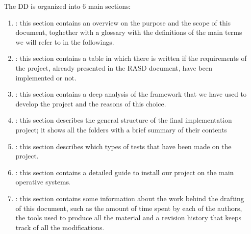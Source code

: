 The DD is organized into 6 main sections:

\begin{enumerate}
\item {\textbf{}}: this section contains an overview on the purpose and the scope of this document, toghether with a glossary with the definitions of the main terms we will refer to in the followings.
\item {\textbf{}}: this section contains a table in which there is written if the requirements of the project, already presented in the RASD document, have been implemented or not.
\item {\textbf{}}: this section contains a deep analysis of the framework that we have used to develop the project and the reasons of this choice.
\item {\textbf{}}: this section describes the general structure of the final implementation project; it shows all the folders with a brief summary of their contents
\item {\textbf{}}: this section describes which types of tests that have been made on the project.
\item {\textbf{}}: this section contains a detailed guide to install our project on the main operative systems.
\item {\textbf{}}: this section contains some information about the work behind the drafting of this
document, such as the amount of time spent by each of the authors, the tools used to produce all
the material and a revision history that keeps track of all the modifications.
\end{enumerate}